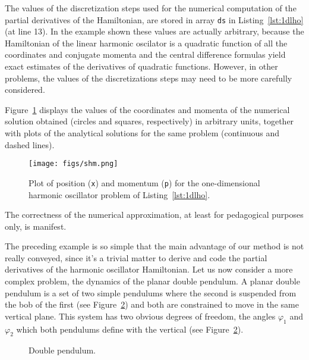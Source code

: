 \documentclass{iopart}
\begin{document}
The values of the discretization steps used for the numerical computation of the
partial derivatives of the Hamiltonian, are stored in array \texttt{ds} in
Listing~\ref{lst:1dlho} (at line 13).  In the example shown these values are
actually arbitrary, because the Hamiltonian of the linear harmonic oscilator is a
quadratic function of all the coordinates and conjugate momenta and the central
difference formulas yield exact estimates of the derivatives of quadratic
functions. However, in other problems, the values of the discretizations steps
may need to be more carefully considered.

Figure~\ref{fig:1dlho} displays the values of the  coordinates and momenta of
the numerical solution obtained (circles and squares, respectively) in arbitrary
units, together with plots of the analytical solutions for the same problem
(continuous and dashed lines).
\begin{figure}[htb]
  \begin{center}
    \texttt{[image: figs/shm.png]}
  \end{center}
  \caption{Plot of position (\texttt{x}) and momentum (\texttt{p}) for the
  one-dimensional harmonic oscillator problem of Listing~\ref{lst:1dlho}.
  }\label{fig:1dlho}
\end{figure}
The correctness of the numerical approximation, at least for pedagogical
purposes only, is manifest.

The preceding example is so simple that the main advantage of our method is not
really conveyed, since it's a trivial matter to derive and code the partial
derivatives of the harmonic oscillator Hamiltonian. Let us now consider a more
complex problem, the dynamics of the planar double pendulum. A planar double
pendulum is a set of two simple pendulums where the second is suspended from the
bob of the first (see Figure~\ref{fig:b}) and both are constrained to move in
the same vertical plane. This system has two obvious degrees of freedom, the
angles $\varphi_1$ and $\varphi_2$ which both pendulums define with the vertical
(see Figure~\ref{fig:b}).
\begin{figure}[htb]
  {\centering
    \caption{\label{fig:b}Double pendulum.}
  }\par
\end{figure}
\end{document}
